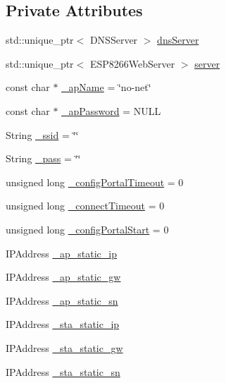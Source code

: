 \subsection*{Private Attributes}
\begin{DoxyCompactItemize}
\item 
std\+::unique\+\_\+ptr$<$ D\+N\+S\+Server $>$ \hyperlink{class_wi_fi_manager_af44ccd00daee619a7bcc89000fa063ca}{dns\+Server}
\item 
std\+::unique\+\_\+ptr$<$ E\+S\+P8266\+Web\+Server $>$ \hyperlink{class_wi_fi_manager_a509523a01c0395cf0dc235b074f2a5ea}{server}
\item 
const char $\ast$ \hyperlink{class_wi_fi_manager_a2c27e2f375122254cde4b2fd9ed1e117}{\+\_\+ap\+Name} = \char`\"{}no-\/net\char`\"{}
\item 
const char $\ast$ \hyperlink{class_wi_fi_manager_a63fb98629ab722ec513c14c73f352c12}{\+\_\+ap\+Password} = N\+U\+LL
\item 
String \hyperlink{class_wi_fi_manager_a43fdc9234ac52d98aeea31148f96526d}{\+\_\+ssid} = \char`\"{}\char`\"{}
\item 
String \hyperlink{class_wi_fi_manager_a7486c2c0b67884ea872a4fe56d3450b2}{\+\_\+pass} = \char`\"{}\char`\"{}
\item 
unsigned long \hyperlink{class_wi_fi_manager_ae6c969ba67e0a029dcde1c3511ca79b7}{\+\_\+config\+Portal\+Timeout} = 0
\item 
unsigned long \hyperlink{class_wi_fi_manager_a6c03ca5d418b4d46e9a6d751a902184c}{\+\_\+connect\+Timeout} = 0
\item 
unsigned long \hyperlink{class_wi_fi_manager_a64bd63776978c1f61ed9e84926cf4a51}{\+\_\+config\+Portal\+Start} = 0
\item 
I\+P\+Address \hyperlink{class_wi_fi_manager_ae81b413e85811506099ba6eab48e1006}{\+\_\+ap\+\_\+static\+\_\+ip}
\item 
I\+P\+Address \hyperlink{class_wi_fi_manager_a5ab87bab28f0dc3c865912b4bb303992}{\+\_\+ap\+\_\+static\+\_\+gw}
\item 
I\+P\+Address \hyperlink{class_wi_fi_manager_a8122027aecd1a1dd9b60f21e87286808}{\+\_\+ap\+\_\+static\+\_\+sn}
\item 
I\+P\+Address \hyperlink{class_wi_fi_manager_ad90d356096742a43b4540117b92faff0}{\+\_\+sta\+\_\+static\+\_\+ip}
\item 
I\+P\+Address \hyperlink{class_wi_fi_manager_a36648ca4819dc0feedaf9e1987d56d96}{\+\_\+sta\+\_\+static\+\_\+gw}
\item 
I\+P\+Address \hyperlink{class_wi_fi_manager_a3fd337255bce688189f9d450cc0ca3a3}{\+\_\+sta\+\_\+static\+\_\+sn}

\end{DoxyCompactItemize}
